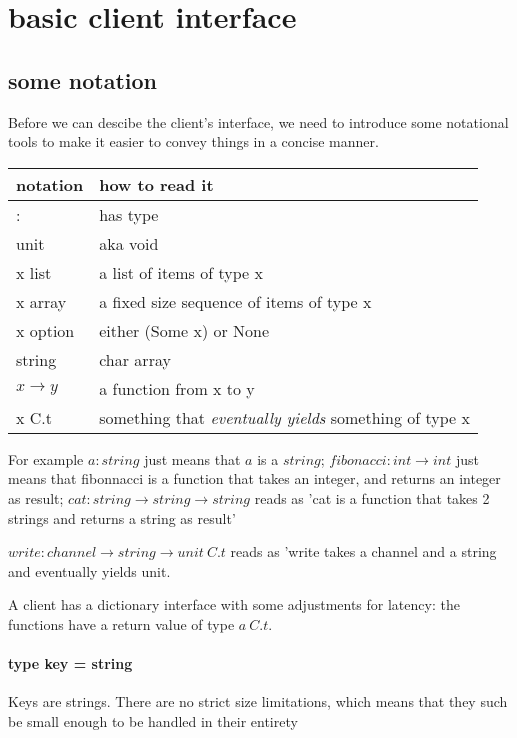 \section{basic client interface}
\subsection{some notation}
Before we can descibe the client's interface, 
we need to introduce some notational tools to make it easier to convey things in a concise manner.

\begin{table}[h]
\begin{tabular}{|l|l|}
\hline
  notation & how to read it \\
\hline
  :                & has type \\
unit               & aka void  \\
x list             & a list of items of type x \\
x array            & a fixed size sequence of items of type x \\
x option           & either (Some x) or None \\
string             & char array \\

$ x \rightarrow y$ & a function from x to y \\
x C.t              & something that \emph{eventually yields} something of type x \\
\hline
\end{tabular}
\end{table}

For example $ a : string $ just means that $a$ is a $string$;
$fibonacci : int \rightarrow int$ just means that fibonnacci is a function that takes an integer, and returns an integer as result;
$cat : string \rightarrow string \rightarrow string$ reads as 'cat is a function that takes 2 strings and returns a string as result'

$write: channel \rightarrow string \rightarrow unit\ C.t$ reads as 'write takes a channel and a string and eventually yields unit.


A client has a dictionary interface with some adjustments for latency: the functions have a return value of type $a\ C.t$.
\paragraph{type key = string}
Keys are strings.
There are no strict size limitations, which means that they such be small enough to be handled in their entirety
